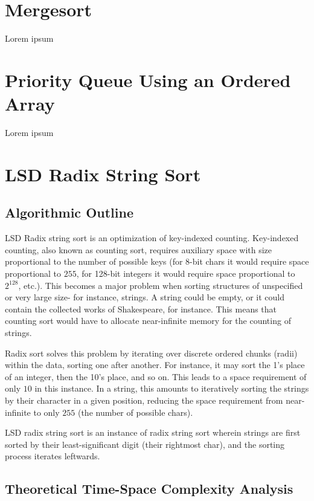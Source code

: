 \documentclass[12pt]{amsart}
\begin{document}
\section{Mergesort}
    Lorem ipsum

\section{Priority Queue Using an Ordered Array}
    Lorem ipsum

\section{LSD Radix String Sort}

    \subsection{Algorithmic Outline}

    LSD Radix string sort is an optimization of key-indexed
    counting. Key-indexed counting, also known as counting sort,
    requires auxiliary space with size proportional to the
    number of possible keys (for 8-bit chars it would require
    space proportional to $255$, for 128-bit integers it would
    require space proportional to $2^{128}$, etc.). This
    becomes a major problem when sorting structures of
    unspecified or very large size- for instance, strings. A
    string could be empty, or it could contain the collected
    works of Shakespeare, for instance. This means that counting
    sort would have to allocate near-infinite memory for the
    counting of strings.

    Radix sort solves this problem by iterating over discrete
    ordered chunks (radii) within the data, sorting one after
    another. For instance, it may sort the 1's place of an
    integer, then the 10's place, and so on. This leads to a
    space requirement of only $10$ in this instance. In a
    string, this amounts to iteratively sorting the strings by
    their character in a given position, reducing the space
    requirement from near-infinite to only $255$ (the number of
    possible chars).

    LSD radix string sort is an instance of radix string sort
    wherein strings are first sorted by their least-significant
    digit (their rightmost char), and the sorting process
    iterates leftwards.

    \subsection{Theoretical Time-Space Complexity Analysis}
\end{document}
